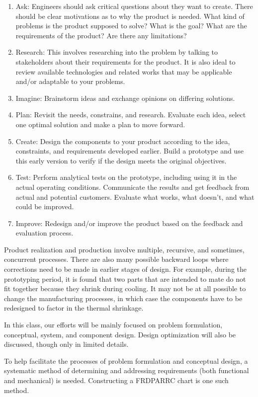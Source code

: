 \documentclass[
10pt,
a4paper,
openany,
svgnames,
]{book}
\begin{document}
\begin{enumerate}
\item Ask: Engineers should ask critical questions about they want to create. There should be clear motivations as to why the product is needed. What kind of problems is the product supposed to solve? What is the goal? What are the requirements of the product? Are there any limitations?
\item Research: This involves researching into the problem by talking to stakeholders about their requirements for the product. It is also ideal to review available technologies and related works that may be applicable and/or adaptable to your problems.
\item Imagine: Brainstorm ideas and exchange opinions on differing solutions.
\item Plan: Revisit the needs, constrains, and research. Evaluate each idea, select one optimal solution and make a plan to move forward.
\item Create: Design the components to your product according to the idea, constraints, and requirements developed earlier. Build a prototype and use this early version to verify if the design meets the original objectives.
\item Test: Perform analytical tests on the prototype, including using it in the actual operating conditions. Communicate the results and get feedback from actual and potential customers. Evaluate what works, what doesn't, and what could be improved.
\item Improve: Redesign and/or improve the product based on the feedback and evaluation process.
\end{enumerate}

Product realization and production involve multiple, recursive, and sometimes, concurrent processes. There are also many possible backward loops where corrections need to be made in earlier stages of design. For example, during the prototyping period, it is found that two parts that are intended to mate do not fit together because they shrink during cooling. It may not be at all possible to change the manufacturing processes, in which case the components have to be redesigned to factor in the thermal shrinkage.

In this class, our efforts will be mainly focused on problem formulation, conceptual, system, and component design. Design optimization will also be discussed, though only in limited details.

To help facilitate the processes of problem formulation and conceptual design, a systematic method of determining and addressing requirements (both functional and mechanical) is needed. Constructing a FRDPARRC chart is one such method.
\end{document}
